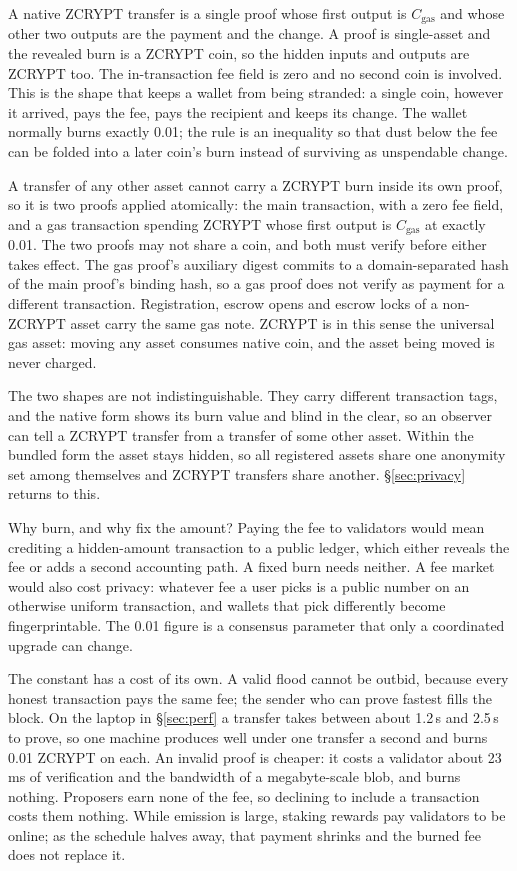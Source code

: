 \documentclass[twocolumn,10pt]{article}
\begin{document}
A native ZCRYPT transfer is a single proof whose first output is $C_{\mathrm{gas}}$ and whose other two outputs are the payment and the change. A proof is single-asset and the revealed burn is a ZCRYPT coin, so the hidden inputs and outputs are ZCRYPT too. The in-transaction fee field is zero and no second coin is involved. This is the shape that keeps a wallet from being stranded: a single coin, however it arrived, pays the fee, pays the recipient and keeps its change. The wallet normally burns exactly 0.01; the rule is an inequality so that dust below the fee can be folded into a later coin's burn instead of surviving as unspendable change.

A transfer of any other asset cannot carry a ZCRYPT burn inside its own proof, so it is two proofs applied atomically: the main transaction, with a zero fee field, and a gas transaction spending ZCRYPT whose first output is $C_{\mathrm{gas}}$ at exactly 0.01. The two proofs may not share a coin, and both must verify before either takes effect. The gas proof's auxiliary digest commits to a domain-separated hash of the main proof's binding hash, so a gas proof does not verify as payment for a different transaction. Registration, escrow opens and escrow locks of a non-ZCRYPT asset carry the same gas note. ZCRYPT is in this sense the universal gas asset: moving any asset consumes native coin, and the asset being moved is never charged.

The two shapes are not indistinguishable. They carry different transaction tags, and the native form shows its burn value and blind in the clear, so an observer can tell a ZCRYPT transfer from a transfer of some other asset. Within the bundled form the asset stays hidden, so all registered assets share one anonymity set among themselves and ZCRYPT transfers share another. \S\ref{sec:privacy} returns to this.

Why burn, and why fix the amount? Paying the fee to validators would mean crediting a hidden-amount transaction to a public ledger, which either reveals the fee or adds a second accounting path. A fixed burn needs neither. A fee market would also cost privacy: whatever fee a user picks is a public number on an otherwise uniform transaction, and wallets that pick differently become fingerprintable. The 0.01 figure is a consensus parameter that only a coordinated upgrade can change.

The constant has a cost of its own. A valid flood cannot be outbid, because every honest transaction pays the same fee; the sender who can prove fastest fills the block. On the laptop in \S\ref{sec:perf} a transfer takes between about 1.2\,s and 2.5\,s to prove, so one machine produces well under one transfer a second and burns 0.01 ZCRYPT on each. An invalid proof is cheaper: it costs a validator about 23\,ms of verification and the bandwidth of a megabyte-scale blob, and burns nothing. Proposers earn none of the fee, so declining to include a transaction costs them nothing. While emission is large, staking rewards pay validators to be online; as the schedule halves away, that payment shrinks and the burned fee does not replace it.
\end{document}
